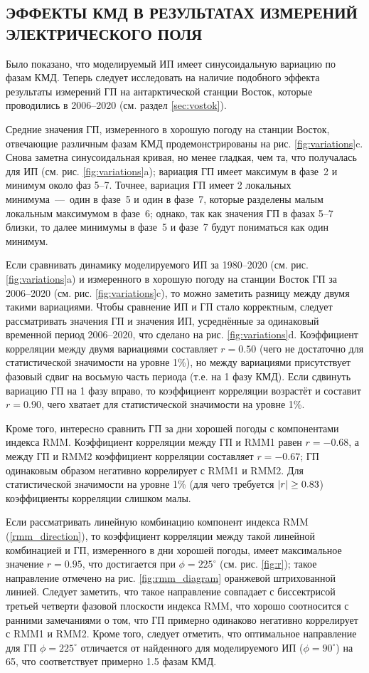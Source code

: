 \subsection{ЭФФЕКТЫ КМД В РЕЗУЛЬТАТАХ ИЗМЕРЕНИЙ ЭЛЕКТРИЧЕСКОГО ПОЛЯ}

Было показано, что моделируемый ИП имеет синусоидальную вариацию по фазам КМД. Теперь следует исследовать на наличие подобного эффекта результаты измерений ГП на антарктической станции Восток, которые проводились в 2006--2020 (см. раздел \ref{sec:vostok}).

Средние значения ГП, измеренного в хорошую погоду на станции Восток, отвечающие различным фазам КМД продемонстрированы на рис. \ref{fig:variations}{c}. Снова заметна синусоидальная кривая, но менее гладкая, чем та, что получалась для ИП (см. рис. \ref{fig:variations}{a}); вариация ГП имеет максимум в фазе~2 и минимум около фаз 5--7. Точнее, вариация ГП имеет 2 локальных минимума~---~один в фазе~5 и один в фазе~7, которые разделены малым локальным максимумом в фазе~6; однако, так как значения ГП в фазах 5--7 близки, то далее минимумы в фазе~5 и фазе~7 будут пониматься как один минимум.

Если сравнивать динамику моделируемого ИП за 1980--2020 (см. рис. \ref{fig:variations}{a}) и измеренного в хорошую погоду на станции Восток ГП за 2006--2020 (см. рис. \ref{fig:variations}{c}), то можно заметить разницу между двумя такими вариациями. Чтобы сравнение ИП и ГП стало корректным, следует рассматривать значения ГП и значения ИП, усреднённые за одинаковый временной период 2006--2020, что сделано на рис. \ref{fig:variations}{d}. Коэффициент корреляции между двумя вариациями составляет $r=0.50$ (чего не достаточно для статистической значимости на уровне 1\%), но между вариациями присутствует фазовый сдвиг на восьмую часть периода (т.е. на 1 фазу КМД). Если сдвинуть вариацию ГП на 1 фазу вправо, то коэффициент корреляции возрастёт и составит $r=0.90$, чего хватает для статистической значимости на уровне 1\%.

Кроме того, интересно сравнить ГП за дни хорошей погоды с компонентами индекса RMM. Коэффициент корреляции между ГП и RMM1 равен $r=-0.68$, а между ГП и RMM2 коэффициент корреляции составляет $r=-0.67$; ГП одинаковым образом негативно коррелирует с RMM1 и RMM2. Для статистической значимости на уровне 1\% (для чего требуется $\abs{r}\ge0.83$) коэффициенты корреляции слишком малы.

Если рассматривать линейную комбинацию компонент индекса RMM (\ref{rmm_direction}), то коэффициент корреляции между такой линейной комбинацией и ГП, измеренного в дни хорошей погоды, имеет максимальное значение $r=0.95$, что достигается при $\phi=225^\circ$ (см. рис. \ref{fig:r}); такое направление отмечено на рис. \ref{fig:rmm_diagram} оранжевой штрихованной линией. Следует заметить, что такое направление совпадает с биссектрисой третьей четверти фазовой плоскости индекса RMM, что хорошо соотносится с ранними замечаниями о том, что ГП примерно одинаково негативно коррелирует с RMM1 и RMM2. Кроме того, следует отметить, что оптимальное направление для ГП $\phi=225^\circ$ отличается от найденного для моделируемого ИП ($\phi=90^\circ$) на 65\textdegree, что соответствует примерно 1.5 фазам КМД.


